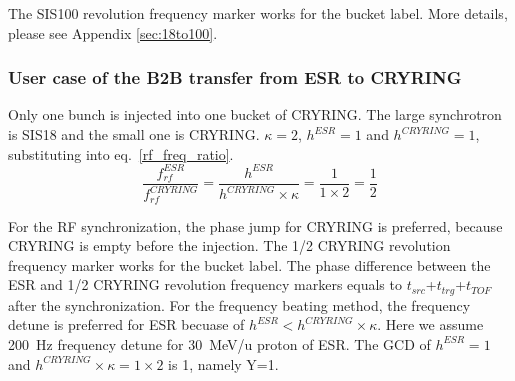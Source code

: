 The SIS100 revolution frequency marker works for the bucket label. More details, please see Appendix \ref{sec:18to100}.

\subsubsection{User case of the B2B transfer from ESR to CRYRING}
Only one bunch is injected into one bucket of CRYRING. The large synchrotron is SIS18 and the small one is CRYRING. $\kappa=2$, $h^{ESR}=1$ and $h^{CRYRING}=1$, substituting into eq.~\ref{rf_freq_ratio}. 
\begin{equation}
\frac{f_{rf}^{ESR}}{f_{rf}^{CRYRING}}= \frac {h^{ESR}}{h^{CRYRING} \times \kappa}= \frac{1}{1 \times 2}=\frac{1}{2}
\end{equation}

For the RF synchronization, the phase jump for CRYRING is preferred, because CRYRING is empty before the injection. The 1/2 CRYRING revolution frequency marker works for the bucket label. The phase difference between the ESR and 1/2 CRYRING revolution frequency markers equals to $t_{src}$+$t_{trg}$+$t_{TOF}$ after the synchronization. 
For the frequency beating method, the frequency detune is preferred for ESR becuase of $h^{ESR} < h^{CRYRING} \times \kappa$. Here we assume \SI{200}{Hz} frequency detune for \SI{30}{MeV/\atomicmassunit} proton of ESR. The GCD of $h^{ESR}=1$ and $h^{CRYRING} \times \kappa=1\times 2$ is 1, namely Y=1.

